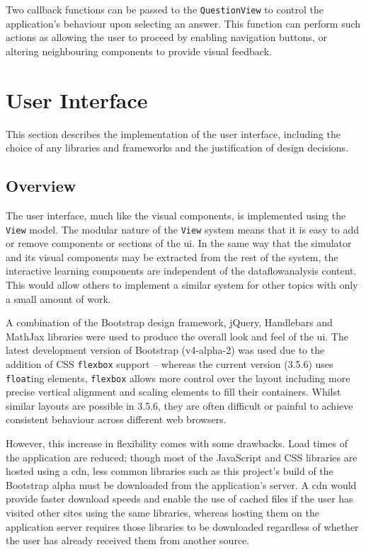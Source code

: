 \documentclass[bsc,twoside,singlespacing,parskip,logo,notimes,normalheadings]{infthesis}
\begin{document}
        Two callback functions can be passed to the {\tt QuestionView}
        to control the application's behaviour upon selecting an
        answer. This function can perform such actions as allowing the
        user to proceed by enabling navigation buttons, or altering
        neighbouring components to provide visual feedback.
            
    \pagebreak

    \section{User Interface}\label{sec:impl-interface}
    This section describes the implementation of the user interface,
    including the choice of any libraries and frameworks and the
    justification of design decisions.
    
        \subsection{Overview}
    
        The user interface, much like the visual components, is
        implemented using the {\tt View} model. The modular nature of
        the {\tt View} system means that it is easy to add or remove
        components or sections of the \gls{ui}. In the same way that the
        simulator and its visual components may be extracted from the
        rest of the system, the interactive learning components are
        independent of the \gls{dataflowanalysis} content. This would
        allow others to implement a similar system for other topics
        with only a small amount of work.

        A combination of the Bootstrap design framework, jQuery,
        Handlebars and MathJax libraries were used to produce the
        overall look and feel of the \gls{ui}. The latest development
        version of Bootstrap (v4-alpha-2) was used due to the addition
        of CSS {\tt flexbox} support -- whereas the current version
        (3.5.6) uses {\tt float}ing elements, {\tt flexbox} allows
        more control over the layout including more precise vertical
        alignment and scaling elements to fill their
        containers. Whilst similar layouts are possible in 3.5.6, they
        are often difficult or painful to achieve consistent behaviour
        across different web browsers.

        However, this increase in flexibility comes with some
        drawbacks. Load times of the application are reduced; though
        most of the JavaScript and CSS libraries are hosted using a
        \gls{cdn}, less common libraries such as this project's build
        of the Bootstrap alpha must be downloaded from the
        application's server. A \gls{cdn} would provide faster
        download speeds and enable the use of cached files if the user
        has visited other sites using the same libraries, whereas
        hosting them on the application server requires those
        libraries to be downloaded regardless of whether the user has
        already received them from another source.
    
\end{document}
